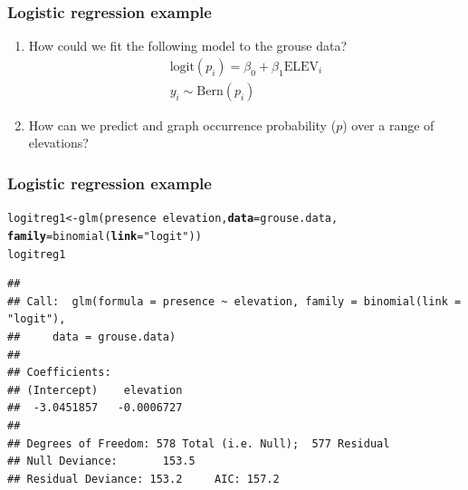 \documentclass[color=usenames,dvipsnames]{beamer}\usepackage[]{graphicx}\usepackage[]{xcolor}
\makeatletter
\newcommand{\hlsng}[1]{\textcolor[rgb]{0.749,0.012,0.012}{#1}}%
\newcommand{\hlopt}[1]{\textcolor[rgb]{0,0,0}{#1}}%
\newcommand{\hldef}[1]{\textcolor[rgb]{0,0,0}{#1}}%
\newcommand{\hlkwb}[1]{\textcolor[rgb]{0,0.341,0.682}{#1}}%
\newcommand{\hlkwc}[1]{\textcolor[rgb]{0,0,0}{\textbf{#1}}}%
\newcommand{\hlkwd}[1]{\textcolor[rgb]{0.004,0.004,0.506}{#1}}%
\newenvironment{kframe}{%
 \def\at@end@of@kframe{}%
 \ifinner\ifhmode%
  \def\at@end@of@kframe{\end{minipage}}%
  \begin{minipage}{\columnwidth}%
 \fi\fi%
 \def\FrameCommand##1{\hskip\@totalleftmargin \hskip-\fboxsep
 \colorbox{shadecolor}{##1}\hskip-\fboxsep
     \hskip-\linewidth \hskip-\@totalleftmargin \hskip\columnwidth}%
 \MakeFramed {\advance\hsize-\width
   \@totalleftmargin\z@ \linewidth\hsize
   \@setminipage}}%
 {\par\unskip\endMakeFramed%
 \at@end@of@kframe}
\newenvironment{knitrout}{}{} %
\makeatother
\begin{document}
\begin{frame}
  \frametitle{Logistic regression example}
  \begin{enumerate}
  \item How could we fit the following model to the grouse data?
    \begin{gather*}
      \mathrm{logit}(p_i) = \beta_0 + \beta_1\mathrm{ELEV}_i \\
      y_i \sim \mathrm{Bern}(p_i)
    \end{gather*}
  \item How can we predict and graph occurrence probability ($p$) over a range of
    elevations?
  \end{enumerate}
\end{frame}



\begin{frame}[fragile]
\frametitle{Logistic regression example}
\begin{knitrout}\scriptsize
{}\color{fgcolor}\begin{kframe}
\begin{alltt}
\hldef{logitreg1} \hlkwb{<-} \hlkwd{glm}\hldef{(presence} \hlopt{~} \hldef{elevation,} \hlkwc{data}\hldef{=grouse.data,}
                 \hlkwc{family}\hldef{=}\hlkwd{binomial}\hldef{(}\hlkwc{link}\hldef{=}\hlsng{"logit"}\hldef{))}
\hldef{logitreg1}
\end{alltt}
\begin{verbatim}
## 
## Call:  glm(formula = presence ~ elevation, family = binomial(link = "logit"), 
##     data = grouse.data)
## 
## Coefficients:
## (Intercept)    elevation  
##  -3.0451857   -0.0006727  
## 
## Degrees of Freedom: 578 Total (i.e. Null);  577 Residual
## Null Deviance:	    153.5 
## Residual Deviance: 153.2 	AIC: 157.2
\end{verbatim}
\end{kframe}
\end{knitrout}
\end{frame}
\end{document}
